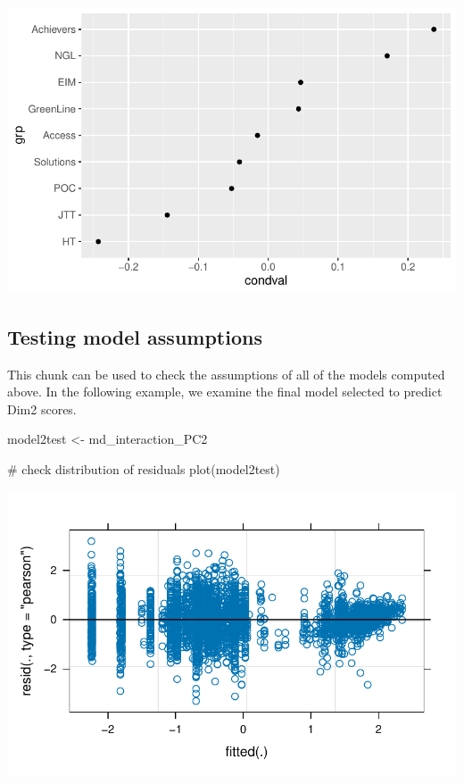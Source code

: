 \documentclass[
  letterpaper,
  DIV=11,
  numbers=noendperiod]{scrreprt}
\newenvironment{Shaded}{\begin{snugshade}}{\end{snugshade}}
\newcommand{\CommentTok}[1]{\textcolor[rgb]{0.37,0.37,0.37}{#1}}
\newcommand{\FunctionTok}[1]{\textcolor[rgb]{0.28,0.35,0.67}{#1}}
\newcommand{\NormalTok}[1]{\textcolor[rgb]{0.00,0.23,0.31}{#1}}
\newcommand{\OtherTok}[1]{\textcolor[rgb]{0.00,0.23,0.31}{#1}}
\begin{document}
\includegraphics{AppendixH_files/figure-pdf/unnamed-chunk-20-2.pdf}

\subsection{Testing model
assumptions}\label{testing-model-assumptions-1}

This chunk can be used to check the assumptions of all of the models
computed above. In the following example, we examine the final model
selected to predict Dim2 scores.

\begin{Shaded}
\begin{Highlighting}[]
\NormalTok{model2test }\OtherTok{\textless{}{-}}\NormalTok{ md\_interaction\_PC2}

\CommentTok{\# check distribution of residuals}
\FunctionTok{plot}\NormalTok{(model2test)}
\end{Highlighting}
\end{Shaded}

\includegraphics{AppendixH_files/figure-pdf/lmer-diagnostics-1.pdf}
\end{document}
